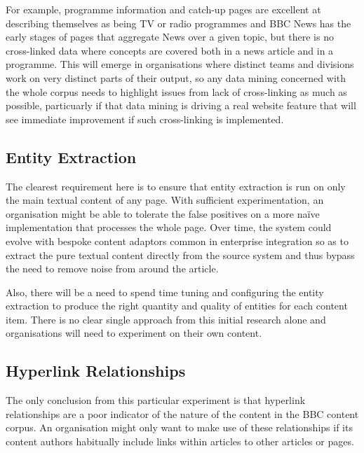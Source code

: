 For example, programme
information and catch-up pages are excellent at describing themselves
as being TV or radio programmes and BBC News has the early stages of
pages that aggregate News over a given topic, but there is no
cross-linked data where concepts are covered both in a news article
and in a programme. This will emerge in organisations where distinct
teams and divisions work on very distinct parts of their output, so
any data mining concerned with the whole corpus needs to highlight
issues from lack of cross-linking as much as possible, particuarly
if that data mining is driving a real website feature that will see
immediate improvement if such cross-linking is implemented.

\subsection{Entity Extraction}

The clearest requirement here is to ensure that entity extraction
is run on only the main textual content of any page. With sufficient
experimentation, an organisation might be able to tolerate the false
positives on a more na\"ive implementation that processes the whole
page. Over time, the system could evolve with bespoke content
adaptors common in enterprise integration so as to extract the pure
textual content directly from the source system and thus bypass
the need to remove noise from around the article.

Also, there will be a need to spend time tuning and configuring
the entity extraction to produce the right quantity and quality of
entities for each content item. There is no clear single approach
from this initial research alone and organisations will need to
experiment on their own content.

\subsection{Hyperlink Relationships}

The only conclusion from this particular experiment is that
hyperlink relationships are a poor indicator of the nature of the
content in the BBC content corpus. An organisation might only want to
make use of these relationships if its content authors habitually
include links within articles to other articles or pages.
